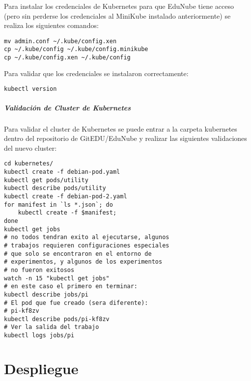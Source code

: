 Para instalar los credenciales de Kubernetes para que EduNube tiene acceso (pero sin perderse los credenciales al MiniKube instalado anteriormente) se realiza los siguientes comandos:
\begin{lstlisting}
mv admin.conf ~/.kube/config.xen
cp ~/.kube/config ~/.kube/config.minikube
cp ~/.kube/config.xen ~/.kube/config
\end{lstlisting}

Para validar que los credenciales se instalaron correctamente:
\begin{lstlisting}
kubectl version
\end{lstlisting}

\subparagraph{Validación de Cluster de Kubernetes}
Para validar el cluster de Kubernetes se puede entrar a la carpeta kubernetes dentro del repositorio de GitEDU/EduNube y realizar las siguientes validaciones del nuevo cluster:
\begin{lstlisting}
cd kubernetes/
kubectl create -f debian-pod.yaml
kubectl get pods/utility
kubectl describe pods/utility
kubectl create -f debian-pod-2.yaml
for manifest in `ls *.json`; do
    kubectl create -f $manifest;
done
kubectl get jobs
# no todos tendran exito al ejecutarse, algunos
# trabajos requieren configuraciones especiales
# que solo se encontraron en el entorno de
# experimentos, y algunos de los experimentos
# no fueron exitosos
watch -n 15 "kubectl get jobs"
# en este caso el primero en terminar:
kubectl describe jobs/pi
# El pod que fue creado (sera diferente):
# pi-kf8zv
kubectl describe pods/pi-kf8zv
# Ver la salida del trabajo
kubectl logs jobs/pi
\end{lstlisting}

  

\section{Despliegue}

